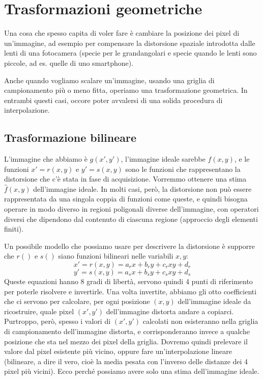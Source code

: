 \documentclass[a4paper,11pt]{article}
\begin{document}
\newpage
\section{Trasformazioni geometriche}
Una cosa che spesso capita di voler fare è cambiare la posizione dei pixel di un'immagine, ad esempio per compensare la distorsione spaziale
introdotta dalle lenti di una fotocamera (specie per le grandangolari e specie quando le lenti sono piccole, ad es. quelle di uno smartphone).
\par
Anche quando vogliamo scalare un'immagine, usando una griglia di campionamento più o meno fitta, operiamo una trasformazione geometrica.
In entrambi questi casi, occore poter avvalersi di una solida procedura di interpolazione.
\subsection{Trasformazione bilineare}
L'immagine che abbiamo è $g(x', y')$, l'immagine ideale sarebbe $f(x,y)$, e le funzioni $x'=r(x,y)$ e $y'=s(x,y)$ sono le funzioni
che rappresentano la distorsione che c'è stata in fase di acquisizione. Vorremmo ottenere una stima $\hat{f}(x,y)$ dell'immagine ideale.
In molti casi, però, la distorsione non può essere rappresentata da una singola coppia di funzioni come queste, e quindi bisogna operare in modo
diverso in regioni poligonali diverse dell'immagine, con operatori diversi che dipendono dal contenuto di ciascuna regione (approccio degli elementi finiti).
\par
Un possibile modello che possiamo usare per descrivere la distorsione è supporre che $r()$ e $s()$ siano funzioni bilineari nelle variabili $x, y$:
\[
x' = r(x,y) = a_r x + b_r y + c_r xy + d_r
\]
\[
y' = s(x,y) = a_s x + b_s y + c_s xy + d_s
\]
Queste equazioni hanno 8 gradi di libertà, servono quindi 4 punti di riferimento per poterle risolvere e invertirle. Una volta invertite, abbiamo gli
otto coefficienti che ci servono per calcolare, per ogni posizione $(x,y)$ dell'immagine ideale da ricostruire, quale pixel $(x',y')$ dell'immagine distorta andare a copiarci.
Purtroppo, però, spesso i valori di $(x',y')$ calcolati non esisteranno nella griglia di campionamento dell'immagine distorta, e corrisponderanno invece a qualche posizione
che sta nel mezzo dei pixel della griglia. Dovremo quindi prelevare il valore dal pixel esistente più vicino, oppure fare un'interpolazione lineare
(bilineare, a dire il vero, cioè la media pesata con l'inverso delle distanze dei 4 pixel più vicini).
Ecco perché possiamo avere solo una stima dell'immagine ideale.
\end{document}
